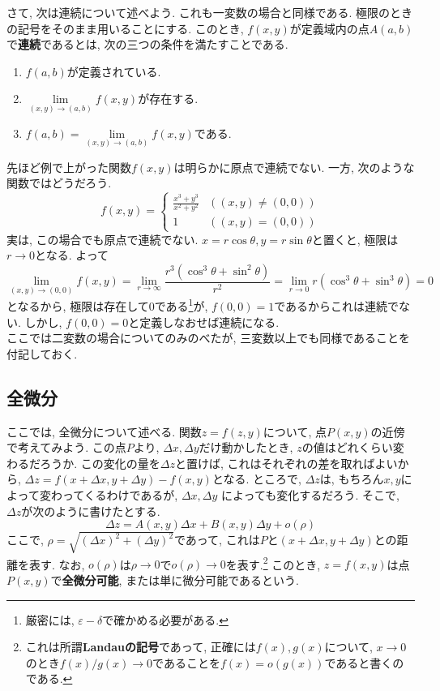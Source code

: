         さて, 次は連続について述べよう. これも一変数の場合と同様である. 極限のときの記号をそのまま用いることにする. このとき, $f(x,y)$が定義域内の点$A(a,b)$で\textbf{連続}であるとは, 次の三つの条件を満たすことである.
        \begin{enumerate}
            \item $f(a,b)$が定義されている.
            \item $\lim\limits_{(x,y)\to(a,b)}f(x,y)$が存在する.
            \item $f(a,b)=\lim\limits_{(x,y)\to(a,b)}f(x,y)$である.
        \end{enumerate}
        先ほど例で上がった関数$f(x,y)$は明らかに原点で連続でない. 一方, 次のような関数ではどうだろう.
        \begin{equation*}
            f(x,y)=\left\{\begin{array}{cc}
                \displaystyle\frac{x^3+y^3}{x^2+y^2} & ((x,y)\neq (0,0))\\
                1 & ((x,y)=(0,0))
            \end{array}\right.
        \end{equation*}
        実は, この場合でも原点で連続でない. $x=r\cos\theta,y=r\sin\theta$と置くと, 極限は$r\to 0$となる. よって
        \begin{equation*}
            \lim_{(x,y)\to(0,0)}f(x,y)=\lim_{r\to\infty}\frac{r^3(\cos^3\theta+\sin^2\theta)}{r^2}=\lim_{r\to 0}r(\cos^3\theta+\sin^3\theta)=0
        \end{equation*}
        となるから, 極限は存在して$0$である\footnote{厳密には, $\varepsilon-\delta$で確かめる必要がある.}が, $f(0,0)=1$であるからこれは連続でない. しかし, $f(0,0)=0$と定義しなおせば連続になる.\\

        ここでは二変数の場合についてのみのべたが, 三変数以上でも同様であることを付記しておく.
    \clearpage
    \subsection{全微分}
        ここでは, 全微分について述べる. 関数$z=f(z,y)$について, 点$P(x,y)$の近傍で考えてみよう. この点$P$より, $\Delta x,\Delta y$だけ動かしたとき, $z$の値はどれくらい変わるだろうか.
        この変化の量を$\Delta z$と置けば, これはそれぞれの差を取ればよいから, $\Delta z=f(x+\Delta x,y+\Delta y)-f(x,y)$となる. ところで, $\Delta z$は, もちろん$x,y$によって変わってくるわけであるが, $\Delta x,\Delta y$
        によっても変化するだろう. そこで, $\Delta z$が次のように書けたとする.
        \begin{equation}
            \Delta z = A(x,y)\Delta x+B(x,y)\Delta y+o(\rho) \label{eq:偏微分:Δzの式}
        \end{equation}
        ここで, $\rho = \sqrt{(\Delta x)^2+(\Delta y)^2}$であって, これは$P$と$(x+\Delta x,y+\Delta y)$との距離を表す.
        なお, $o(\rho)$は$\rho\to 0$で$o(\rho)\to 0$を表す.\footnote{これは所謂\textbf{Landauの記号}であって, 正確には$f(x),g(x)$について, $x\to 0$のとき$f(x)/g(x)\to 0$であることを$f(x)=o(g(x))$であると書くのである.}
        このとき, $z=f(x,y)$は点$P(x,y)$で\textbf{全微分可能}, または単に微分可能であるという.

